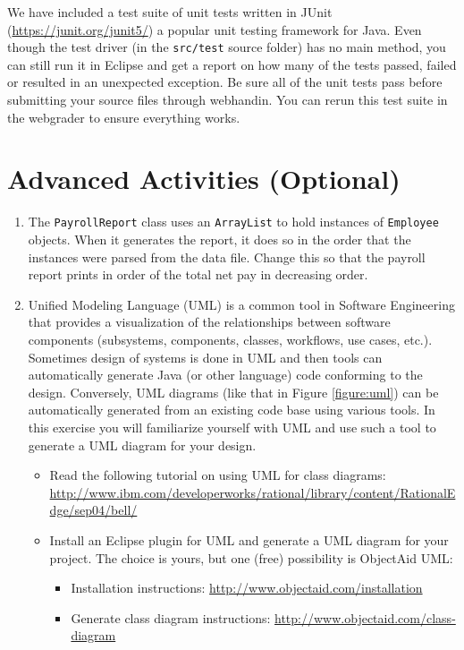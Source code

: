 \documentclass[12pt]{scrartcl}
\begin{document}
We have included a test suite of unit tests written in JUnit 
(\url{https://junit.org/junit5/}) a popular unit testing framework for
Java.  Even though the test driver (in the \texttt{src/test}
source folder) has no main method, you can still run it in Eclipse and
get a report on how many of the tests passed, failed or resulted in 
an unexpected exception.  Be sure all of the unit tests pass before
submitting your source files through webhandin.  You can rerun this
test suite in the webgrader to ensure everything works.  

\section*{Advanced Activities (Optional)}

\begin{enumerate}
  \item The \texttt{PayrollReport} class uses an 
    \texttt{ArrayList} to hold instances of 
    \texttt{Employee} objects.  When it generates the report, 
    it does so in the order that the instances were parsed from the 
    data file.  Change this so that the payroll report prints in order 
    of the total net pay in decreasing order.  
    
  \item Unified Modeling Language (UML) is a common tool in Software
    Engineering that provides a visualization of the relationships 
    between software components (subsystems, components, classes, 
    workflows, use cases, etc.).  Sometimes design of systems is done 
    in UML and then tools can automatically generate Java (or other 
    language) code conforming to the design.  Conversely, UML diagrams 
    (like that in Figure \ref{figure:uml}) can be automatically generated 
    from an existing code base using various tools.  In this exercise 
    you will familiarize yourself with UML and use such a tool to 
    generate a UML diagram for your design.
    \begin{itemize}
      \item Read the following tutorial on using UML for class diagrams:
\url{http://www.ibm.com/developerworks/rational/library/content/RationalEdge/sep04/bell/}
      \item Install an Eclipse plugin for UML and generate a UML diagram 
      for your project.  The choice is yours, but one (free) possibility 
      is ObjectAid UML:
      \begin{itemize}
        \item Installation instructions: 
        \url{http://www.objectaid.com/installation}
	    \item Generate class diagram instructions: 
        \url{http://www.objectaid.com/class-diagram}
      \end{itemize}
    \end{itemize}
\end{enumerate}
\end{document}
